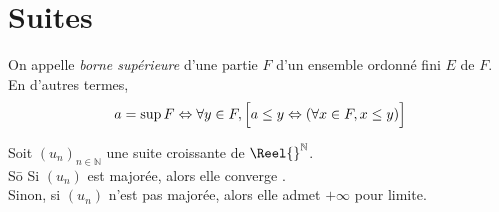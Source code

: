 \documentclass[11pt,a4paper,fleqn,pdftex]{report}
\begin{document}
\chapter{Suites}
\begin{dfn}
     On appelle \emph{borne supérieure} d'une partie $F$ d'un ensemble ordonné fini $E$  de $F$.\newline
     En d'autres termes,
     \begin{equation}
      a = \sup F \Leftrightarrow \forall y \in F, \left[ \vphantom{\sum{}} a \le y \Leftrightarrow \left( \forall x \in F, x \le y \right) \right]
     \end{equation} 
\end{dfn}
\begin{itheorem}
    \begin{tabbing}
     Soit $\left( u_n\right)_{n\in \mathbb{N}}$ une suite croissante de $\Reel{}^\mathbb{N}$. \\
     So\= \kill
     \> Si $(u_n)$ est majorée, alors elle converge .\\
     \> Sinon, si $(u_n)$ n'est pas majorée, alors elle admet $+\infty$ pour limite.
     \end{tabbing}
\end{itheorem}
\end{document}
